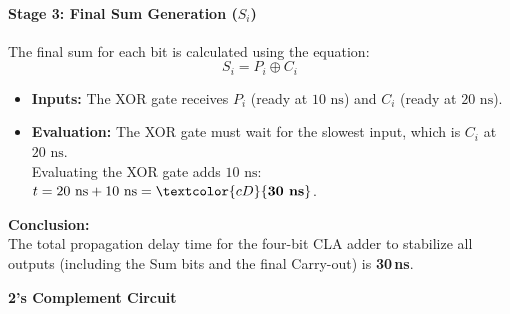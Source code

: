 \documentclass[12pt,a3paper]{article}
\newcommand{\subtopic}[2]{%
  \vspace{10pt}
  \noindent\begin{tcolorbox}[colback=#1!8,colframe=#1,boxrule=0.6pt,arc=4pt,
    left=6pt,right=6pt,top=4pt,bottom=4pt]
    \small\bfseries\textcolor{#1}{#2}
  \end{tcolorbox}
  \vspace{2pt}
}
\begin{document}
\begin{enumerate}
\begin{tcolorbox}[enhanced,breakable,ansbox,colback=cD!4,colframe=cD,boxrule=0.8pt,arc=5pt,title={\textbf{Answer}},fonttitle=\bfseries\color{white},colbacktitle=cD]
\paragraph{Stage 3: Final Sum Generation ($S_i$)}
The final sum for each bit is calculated using the equation:
\[
    S_i = P_i \oplus C_i
\]
\begin{itemize}
    \item \textbf{Inputs:} The XOR gate receives $P_i$ (ready at $10\text{ ns}$) and $C_i$ (ready at $20\text{ ns}$).
    \item \textbf{Evaluation:} The XOR gate must wait for the slowest input, which is $C_i$ at $20\text{ ns}$. \\
    Evaluating the XOR gate adds $10\text{ ns}$: \quad $t = 20\text{ ns} + 10\text{ ns} = \textcolor{cD}{\textbf{30\text{ ns}}}$.
\end{itemize}

\vspace{0.2cm}
\textbf{Conclusion:} \\
The total propagation delay time for the four-bit CLA adder to stabilize all outputs (including the Sum bits and the final Carry-out) is \textcolor{cD}{\textbf{30\,ns}}.

\end{tcolorbox}

\end{enumerate}

\subtopic{cD}{2's Complement Circuit}
\label{sub:s4-2scomp}
\end{document}
